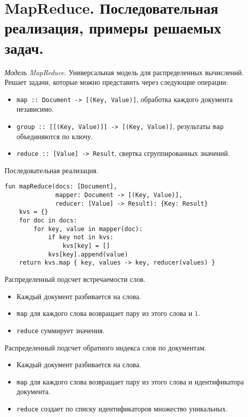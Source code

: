 \section{MapReduce. Последовательная реализация, примеры решаемых задач.}

\begin{definition}
    \textit{Модель MapReduce}. Универсальная модель для распределенных
    вычислений. Решает задачи, которые можно представить через следующие операции:
    \begin{itemize}
      \item \texttt{map :: Document -> [(Key, Value)]}, обработка каждого
        документа независимо.
      \item \texttt{group :: [[(Key, Value)]] -> [(Key, Value)]},
        результаты \texttt{map} объединяются по ключу.
      \item \texttt{reduce :: [Value] -> Result}, свертка сгруппированных
        значений.
    \end{itemize}
\end{definition}

\begin{algorithm}
  Последовательная реализация.
  \begin{lstlisting}
fun mapReduce(docs: [Document],
              mapper: Document -> [(Key, Value)],
              reducer: [Value] -> Result): {Key: Result}
    kvs = {}
    for doc in docs:
        for key, value in mapper(doc):
            if key not in kvs:
                kvs[key] = []
            kvs[key].append(value)
    return kvs.map { key, values -> key, reducer(values) }
  \end{lstlisting}
\end{algorithm}

\begin{example}
  Распределенный подсчет встречаемости слов.
  \begin{itemize}
    \item Каждый документ разбивается на слова.
    \item \texttt{map} для каждого слова возвращает пару из этого слова и $1$.
    \item \texttt{reduce} суммирует значения.
  \end{itemize}
\end{example}

\begin{example}
  Распределенный подсчет обратного индекса слов по документам.
  \begin{itemize}
    \item Каждый документ разбивается на слова.
    \item \texttt{map} для каждого слова возвращает пару из этого слова и
      идентификатора документа.
    \item \texttt{reduce} создает по списку идентификаторов множество
      уникальных.
  \end{itemize}
\end{example}
